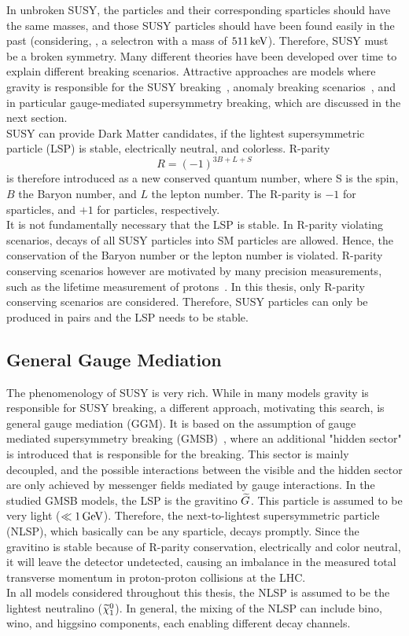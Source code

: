 In unbroken SUSY, the particles and their corresponding sparticles should have the same masses, and those SUSY particles should have been found easily in the past (considering, \eg, a selectron with a mass of $511\,\text{ke\hspace{-.08em}V}$). Therefore, SUSY must be a broken symmetry. Many different theories have been developed over time to explain different breaking scenarios. Attractive approaches are models where gravity is responsible for the SUSY breaking~\cite{SUSYPrimer}, anomaly breaking scenarios~\cite{AMSB}, and in particular gauge-mediated supersymmetry breaking, which are discussed in the next section.\\
SUSY can provide Dark Matter candidates, if the lightest supersymmetric particle (LSP) is stable, electrically neutral, and colorless.
R-parity
\begin{equation}
 R = (-1)^{3B+L+S}
\end{equation}
is therefore introduced as a new conserved quantum number, where S is the spin, $B$ the Baryon number, and $L$ the lepton number. The R-parity is $-1$ for sparticles, and $+1$ for particles, respectively.\\
It is not fundamentally necessary that the LSP is stable. In R-parity violating scenarios, decays of all SUSY particles into SM particles are allowed. Hence, the conservation of the Baryon number or the lepton number is violated. R-parity conserving scenarios however are motivated by many precision measurements, such as the lifetime measurement of protons~\cite{ProtonDecay}.
In this thesis, only R-parity conserving scenarios are considered. Therefore, SUSY particles can only be produced in pairs and the LSP needs to be stable.\\



\subsection{General Gauge Mediation}\label{sec:GGM}
The phenomenology of SUSY is very rich. While in many models gravity is responsible for SUSY breaking, a different approach, motivating this search, is general gauge mediation (GGM). It is based on the assumption of gauge mediated supersymmetry breaking (GMSB)~\cite{GGM}, where an additional "hidden sector" is introduced that is responsible for the breaking. This sector is mainly decoupled, and the possible interactions between the visible and the hidden sector are only achieved by messenger fields mediated by gauge interactions. In the studied GMSB models, the LSP is the gravitino $\widetilde{G}$. This particle is assumed to be very light ($\ll1\,\text{Ge\hspace{-.08em}V}$). Therefore, the next-to-lightest supersymmetric particle (NLSP), which basically can be any sparticle, decays promptly. Since the gravitino is stable because of R-parity conservation, electrically and color neutral, it will leave the detector undetected, causing an imbalance in the measured total transverse momentum in proton-proton collisions at the LHC.\\
In all models considered throughout this thesis, the NLSP is assumed to be the lightest neutralino ($\widetilde{\chi}^{0}_{1}$). In general, the mixing of the NLSP can include bino, wino, and higgsino components, each enabling different decay channels.



